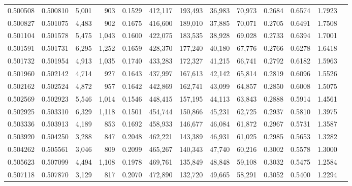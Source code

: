 \begin{tabular}{rrrrrrrrrrrrr}
0.500508 & 0.500810 &  5,001 &   903 &                                     0.1529 & 412,117 & 193,493 &  36,983 &  70,973 & 0.2684 & 0.6574 & 1.7923 \\
0.500827 & 0.501075 &  4,483 &   902 &                                     0.1675 & 416,600 & 189,010 &  37,885 &  70,071 & 0.2705 & 0.6491 & 1.7508 \\
0.501104 & 0.501578 &  5,475 & 1,043 &                                     0.1600 & 422,075 & 183,535 &  38,928 &  69,028 & 0.2733 & 0.6394 & 1.7001 \\
0.501591 & 0.501731 &  6,295 & 1,252 &                                     0.1659 & 428,370 & 177,240 &  40,180 &  67,776 & 0.2766 & 0.6278 & 1.6418 \\
0.501732 & 0.501954 &  4,913 & 1,035 &                                     0.1740 & 433,283 & 172,327 &  41,215 &  66,741 & 0.2792 & 0.6182 & 1.5963 \\
0.501960 & 0.502142 &  4,714 &   927 &                                     0.1643 & 437,997 & 167,613 &  42,142 &  65,814 & 0.2819 & 0.6096 & 1.5526 \\
0.502162 & 0.502524 &  4,872 &   957 &                                     0.1642 & 442,869 & 162,741 &  43,099 &  64,857 & 0.2850 & 0.6008 & 1.5075 \\
0.502569 & 0.502923 &  5,546 & 1,014 &                                     0.1546 & 448,415 & 157,195 &  44,113 &  63,843 & 0.2888 & 0.5914 & 1.4561 \\
0.502925 & 0.503310 &  6,329 & 1,118 &                                     0.1501 & 454,744 & 150,866 &  45,231 &  62,725 & 0.2937 & 0.5810 & 1.3975 \\
0.503336 & 0.503913 &  4,189 &   853 &                                     0.1692 & 458,933 & 146,677 &  46,084 &  61,872 & 0.2967 & 0.5731 & 1.3587 \\
0.503920 & 0.504250 &  3,288 &   847 &                                     0.2048 & 462,221 & 143,389 &  46,931 &  61,025 & 0.2985 & 0.5653 & 1.3282 \\
0.504262 & 0.505561 &  3,046 &   809 &                                     0.2099 & 465,267 & 140,343 &  47,740 &  60,216 & 0.3002 & 0.5578 & 1.3000 \\
0.505623 & 0.507099 &  4,494 & 1,108 &                                     0.1978 & 469,761 & 135,849 &  48,848 &  59,108 & 0.3032 & 0.5475 & 1.2584 \\
0.507118 & 0.507870 &  3,129 &   817 &                                     0.2070 & 472,890 & 132,720 &  49,665 &  58,291 & 0.3052 & 0.5400 & 1.2294 \\

\end{tabular}
